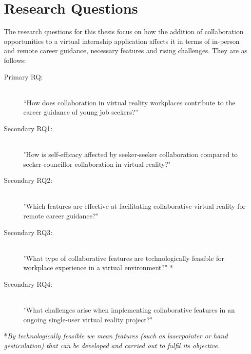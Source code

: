 \section{Research Questions}
The research questions for this thesis focus on how the addition of collaboration opportunities to a virtual internship application affects it in terms of in-person and remote career guidance, necessary features and rising challenges. They are as follows:
\label{RQ}
\begin{description}
    \item [Primary RQ:]\hfill \\
    “How does collaboration in virtual reality workplaces contribute to the career guidance of young job seekers?” 
    \item [Secondary RQ1:]\hfill \\
    "How is self-efficacy affected by seeker-seeker collaboration compared to seeker-councillor collaboration in virtual reality?"
    \item [Secondary RQ2:]\hfill \\
    "Which features are effective at facilitating collaborative virtual reality for remote career guidance?"
    \item [Secondary RQ3:]\hfill \\
    "What type of collaborative features are technologically feasible for workplace experience in a virtual environment?" *
    \item  [Secondary RQ4:]\hfill \\
    "What challenges arise when implementing collaborative features in an ongoing single-user virtual reality project?"
    
\end{description}

\vspace{2cm}
*\textit{By technologically feasible we mean features (such as laserpointer or hand gesticulation) that can be developed and carried out to fulfil its objective. }


\cleardoublepage

